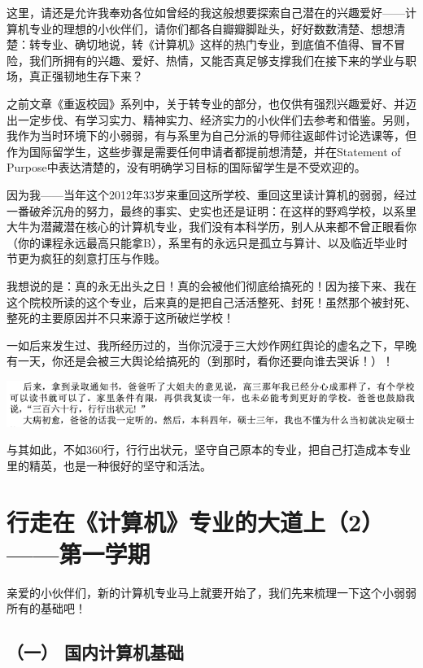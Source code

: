 \documentclass[9pt, b5paper]{article}
\begin{document}
这里，请还是允许我奉劝各位如曾经的我这般想要探索自己潜在的兴趣爱好——计算机专业的理想的小伙伴们，请你们都各自瓣瓣脚趾头，好好数数清楚、想想清楚：转专业、确切地说，转《计算机》这样的热门专业，到底值不值得、冒不冒险，我们所拥有的兴趣、爱好、热情，又能否真足够支撑我们在接下来的学业与职场，真正强韧地生存下来？

之前文章《重返校园》系列中，关于转专业的部分，也仅供有强烈兴趣爱好、并迈出一定步伐、有学习实力、精神实力、经济实力的小伙伴们去参考和借鉴。另则，我作为当时环境下的小弱弱，有与系里为自己分派的导师往返邮件讨论选课等，但作为国际留学生，这些步骤是需要任何申请者都提前想清楚，并在Statement of Purpose中表达清楚的，没有明确学习目标的国际留学生是不受欢迎的。

因为我——当年这个2012年33岁来重回这所学校、重回这里读计算机的弱弱，经过一番破斧沉舟的努力，最终的事实、史实也还是证明：在这样的野鸡学校，以系里大牛为潜藏潜在核心的计算机专业，我们没有本科学历，别人从来都不曾正眼看你（你的课程永远最高只能拿B），系里有的永远只是孤立与算计、以及临近毕业时节更为疯狂的刻意打压与作贱。

我想说的是：真的永无出头之日！真的会被他们彻底给搞死的！因为接下来、我在这个院校所读的这个专业，后来真的是把自己活活整死、封死！虽然那个被封死、整死的主要原因并不只来源于这所破烂学校！

一如后来发生过、我所经历过的，当你沉浸于三大炒作网红舆论的虚名之下，早晚有一天，你还是会被三大舆论给搞死的（到那时，看你还要向谁去哭诉！）！

\begin{center}
\includegraphics[width=.9\linewidth]{./pic/backups_plans_20210424_092841.png}
\end{center}

与其如此，不如360行，行行出状元，坚守自己原本的专业，把自己打造成本专业里的精英，也是一种很好的坚守和活法。

\section{行走在《计算机》专业的大道上（2）——第一学期}
\label{sec:orgcd05d3d}

亲爱的小伙伴们，新的计算机专业马上就要开始了，我们先来梳理一下这个小弱弱所有的基础吧！

\subsection{（一） 国内计算机基础}
\label{sec:orgf856f77}
\end{document}
